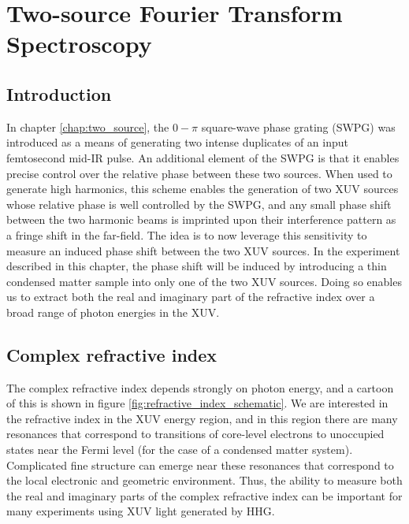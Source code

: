 \chapter{Two-source Fourier Transform Spectroscopy}
\label{chap:refractive_index}

\section{Introduction}
\label{intro_ts}
In chapter \ref{chap:two_source}, the $0-\pi$ square-wave phase grating (SWPG) was introduced as a means of generating two intense duplicates of an input femtosecond mid-IR pulse.  An additional element of the SWPG is that it enables precise control over the relative phase between these two sources.  When used to generate high harmonics, this scheme enables the generation of two XUV sources whose relative phase is well controlled by the SWPG, and any small phase shift between the two harmonic beams is imprinted upon their interference pattern as a fringe shift in the far-field.  The idea is to now leverage this sensitivity to measure an induced phase shift between the two XUV sources.  In the experiment described in this chapter, the phase shift will be induced by introducing a thin condensed matter sample into only one of the two XUV sources.  Doing so enables us to extract both the real and imaginary part of the refractive index over a broad range of photon energies in the XUV.
\section{Complex refractive index}
The complex refractive index depends strongly on photon energy, and a cartoon of this is shown in figure \ref{fig:refractive_index_schematic}. We are interested in the refractive index in the XUV energy region, and in this region there are many resonances that correspond to transitions of core-level electrons to unoccupied states near the Fermi level (for the case of a condensed matter system)\cite{stohrNEXAFSSpectroscopy1992, attwoodSoftXraysExtreme2000}.  Complicated fine structure can emerge near these resonances that correspond to the local electronic and geometric environment\cite{stohrNEXAFSSpectroscopy1992, attwoodSoftXraysExtreme2000}.  Thus, the ability to measure both the real and imaginary parts of the complex refractive index can be important for many experiments using XUV light generated by HHG\cite{kaplanFemtosecondTrackingCarrier2018,  cirriAchievingSurfaceSensitivity2017}.

